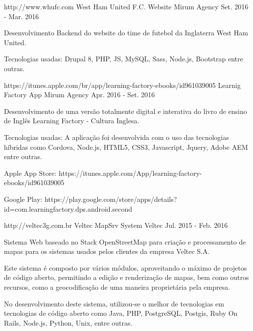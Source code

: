 \begin{cventries}

 \cventry
    {http://www.whufc.com} %
    {West Ham United F.C. Website} %
    {Mirum Agency} %
    {Set. 2016 - Mar. 2016} %
    {
      \begin{cvitems} %
        \item {Desenvolvimento Backend do website do time de futebol da Inglaterra West Ham United.}
        \item {Tecnologias usadas: Drupal 8, PHP, JS, MySQL, Sass, Node.js, Bootstrap entre outras.}
      \end{cvitems}
    }


 \cventry
    {https://itunes.apple.com/br/app/learning-factory-ebooks/id961039005} %
    {Learnig Factory App } %
    {Mirum Agency} %
    {Apr. 2016 - Set. 2016} %
    {
      \begin{cvitems} %
        \item {Desenvolvimento de uma versão totalmente digital e interativa do livro de ensino de Inglês Learning Factory - Cultura Inglesa.}
         \item {Tecnologias usadas: A aplicação foi desenvolvida com o uso das tecnologias híbridas como Cordova, Node.js, HTML5, CSS3, Javascript, Jquery, Adobe AEM entre outras.}
           \item { Apple App Store: https://itunes.apple.com/App/learning-factory-ebooks/id961039005}
             \item { Google Play: https://play.google.com/store/apps/details?id=com.learningfactory.dps.android.second}
      \end{cvitems}
    }


 \cventry
    {http://veltec3g.com.br} %
    {Veltec MapSrv System} %
    {Veltec} %
    {Jul. 2015 - Feb. 2016} %
    {
      \begin{cvitems} %
        \item {Sistema Web baseado no Stack OpenStreetMap para criação e processamento de mapas para os sistemas usados pelos clientes da empresa Veltec S.A.}
        \item {Este sistema é composto por vários módulos, aproveitando o máximo de projetos de código aberto, permitindo a edição e renderização de mapas, bem como outros recursos, como a geocodificação de uma maneira proprietária pela empresa.}
        \item {No desenvolvimento deste sistema, utilizou-se o melhor de tecnologias em tecnologias de código aberto como Java, PHP, PostgreSQL, Postgis, Ruby On Rails, Node.js, Python, Unix, entre outras.}
      \end{cvitems}
    }

\end{cventries}
